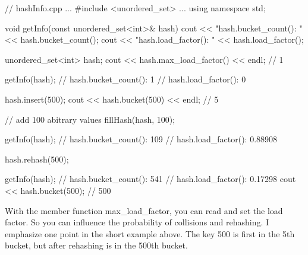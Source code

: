 \begin{cpp}
// hashInfo.cpp
...
#include <unordered_set>
...
using namespace std;

void getInfo(const unordered_set<int>& hash){
	cout << "hash.bucket_count(): " << hash.bucket_count();
	cout << "hash.load_factor(): " << hash.load_factor();
}

unordered_set<int> hash;
cout << hash.max_load_factor() << endl; // 1

getInfo(hash);
	// hash.bucket_count(): 1
	// hash.load_factor(): 0

hash.insert(500);
cout << hash.bucket(500) << endl; // 5

// add 100 abitrary values
fillHash(hash, 100);

getInfo(hash);
	// hash.bucket_count(): 109
	// hash.load_factor(): 0.88908

hash.rehash(500);

getInfo(hash);
	// hash.bucket_count(): 541
	// hash.load_factor(): 0.17298
cout << hash.bucket(500); // 500
\end{cpp}

With the member function max\_load\_factor, you can read and set the load factor. So you can influence the probability of collisions and rehashing. I emphasize one point in the short example above. The key 500 is first in the 5th bucket, but after rehashing is in the 500th bucket.















